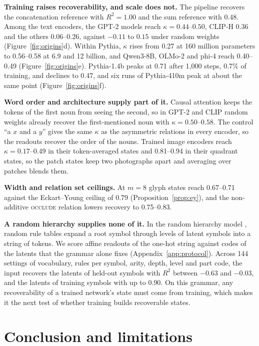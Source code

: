 \textbf{Training raises recoverability, and scale does not.} The pipeline recovers the concatenation reference with $R^2 = 1.00$ and the sum reference with 0.48. Among the text encoders, the GPT-2 models reach $\kappa = 0.44$--$0.50$, CLIP-H 0.36 and the others 0.06--0.26, against $-0.11$ to $0.15$ under random weights (Figure~\ref{fig:origins}d). Within Pythia, $\kappa$ rises from 0.27 at 160 million parameters to 0.56--0.58 at 6.9 and 12 billion, and Qwen3-8B, OLMo-2 and phi-4 reach 0.40--0.49 (Figure~\ref{fig:origins}e). Pythia-1.4b peaks at 0.71 after 1{,}000 steps, 0.7\% of training, and declines to 0.47, and six runs of Pythia-410m peak at about the same point (Figure~\ref{fig:origins}f).

\textbf{Word order and architecture supply part of it.} Causal attention keeps the tokens of the first noun from seeing the second, so in GPT-2 and CLIP random weights already recover the first-mentioned noun with $\kappa = 0.50$--$0.58$. The control ``a $x$ and a $y$'' gives the same $\kappa$ as the asymmetric relations in every encoder, so the readouts recover the order of the nouns. Trained image encoders reach $\kappa = 0.17$--$0.49$ in their token-averaged states and 0.81--0.94 in their quadrant states, so the patch states keep two photographs apart and averaging over patches blends them.

\textbf{Width and relation set ceilings.} At $m = 8$ glyph states reach 0.67--0.71 against the Eckart--Young ceiling of 0.79 (Proposition~\ref{prop:ey}), and the non-additive \textsc{occlude} relation lowers recovery to 0.75--0.83.

\textbf{A random hierarchy supplies none of it.} In the random hierarchy model \citep{cagnetta2024rhm}, random rule tables expand a root symbol through levels of latent symbols into a string of tokens. We score affine readouts of the one-hot string against codes of the latents that the grammar alone fixes (Appendix~\ref{app:protocol}). Across 144 settings of vocabulary, rules per symbol, arity, depth, level and part code, the input recovers the latents of held-out symbols with $R^2$ between $-0.63$ and $-0.03$, and the latents of training symbols with up to 0.90. On this grammar, any recoverability of a trained network's state must come from training, which makes it the next test of whether training builds recoverable states.

\section{Conclusion and limitations}
\label{sec:discussion}

